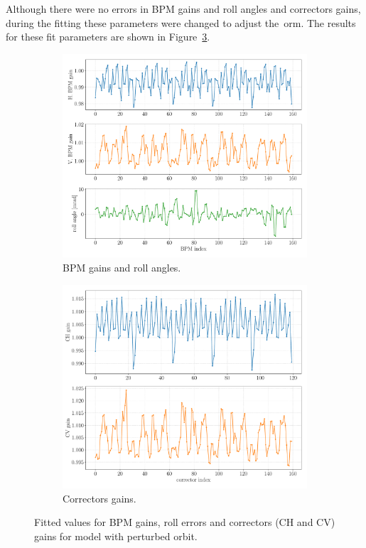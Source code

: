 Although there were no errors in BPM gains and roll angles and correctors gains, during the fitting these parameters were changed to adjust the~\gls{orm}. The results for these fit parameters are shown in Figure~\ref{fig:gain_fit_orb}.
\begin{figure}
\centering
\begin{subfigure}[t]{0.49\textwidth}
\includegraphics[width=1.0\textwidth]{figures/bpm_gains_orbit_distortion.pdf}
    \caption{BPM gains and roll angles.}
    \label{subfig:bpm_fit_orb}
\end{subfigure}
 \begin{subfigure}[t]{0.49\textwidth}
\includegraphics[width=1.0\textwidth]{figures/corr_gains_orbit_distortion.pdf}
    \caption{Correctors gains.}
    \label{subfig:corr_fit_orb}
\end{subfigure}
\caption{Fitted values for BPM gains, roll errors and correctors (CH and CV) gains for model with perturbed orbit.}
\label{fig:gain_fit_orb}
\end{figure}


